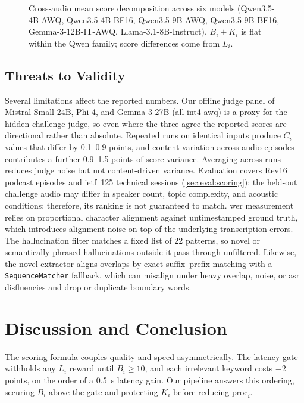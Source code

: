\documentclass[conference,letterpaper]{IEEEtran}
\begin{document}
\begin{figure}[htb!]
    \centering
    
    \caption{Cross-audio mean score decomposition across six models (Qwen3.5-4B-AWQ, Qwen3.5-4B-BF16, Qwen3.5-9B-AWQ, Qwen3.5-9B-BF16, Gemma-3-12B-IT-AWQ, Llama-3.1-8B-Instruct). $B_i + K_i$ is flat within the Qwen family; score differences come from $L_i$.}
    \label{fig:model-sweep}
\end{figure}

\subsection{Threats to Validity}
\label{sec:eval:threats}

Several limitations affect the reported numbers.
Our offline judge panel of Mistral-Small-24B, Phi-4, and Gemma-3-27B (all int4-\gls{awq}) is a proxy for the hidden challenge judge, so even where the three agree the reported scores are directional rather than absolute.
Repeated runs on identical inputs produce $C_i$ values that differ by \num{0.1}--\num{0.9} points, and content variation across audio episodes contributes a further \num{0.9}--\num{1.5} points of score variance.
Averaging across runs reduces judge noise but not content-driven variance.
Evaluation covers Rev16 podcast episodes and \gls{ietf}~125 technical sessions (\cref{sec:eval:scoring}); the held-out challenge audio may differ in speaker count, topic complexity, and acoustic conditions; therefore, its ranking is not guaranteed to match.
\gls{wer} measurement relies on proportional character alignment against untimestamped ground truth, which introduces alignment noise on top of the underlying transcription errors.
The hallucination filter matches a fixed list of \num{22} patterns, so novel or semantically phrased hallucinations outside it pass through unfiltered.
Likewise, the novel extractor aligns overlaps by exact suffix--prefix matching with a \texttt{SequenceMatcher} fallback, which can misalign under heavy overlap, noise, or \gls{asr} disfluencies and drop or duplicate boundary words.

\section{Discussion and Conclusion}
\label{sec:conclusion}

The scoring formula couples quality and speed asymmetrically.
The latency gate withholds any $L_i$ reward until $B_i \ge 10$, and each irrelevant keyword costs $-2$ points, on the order of a \SI{0.5}{\second} latency gain.
Our pipeline answers this ordering, securing $B_i$ above the gate and protecting $K_i$ before reducing $\text{proc}_i$.
\end{document}
